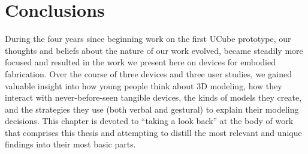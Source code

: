 \chapter{Conclusions}
\label{conclusions}

During the four years since beginning work on the first UCube prototype, our
thoughts and beliefs about the nature of our work evolved, became steadily more
focused and resulted in the work we present here on devices for embodied
fabrication. Over the course of three devices and three user studies, we gained
valuable insight into how young people think about 3D modeling, how they
interact with never-before-seen tangible devices, the kinds of models they
create, and the strategies they use (both verbal and gestural) to explain their
modeling decisions. This chapter is devoted to ``taking a look back'' at the
body of work that comprises this thesis and attempting to distill the most
relevant and unique findings into their most basic parts.
